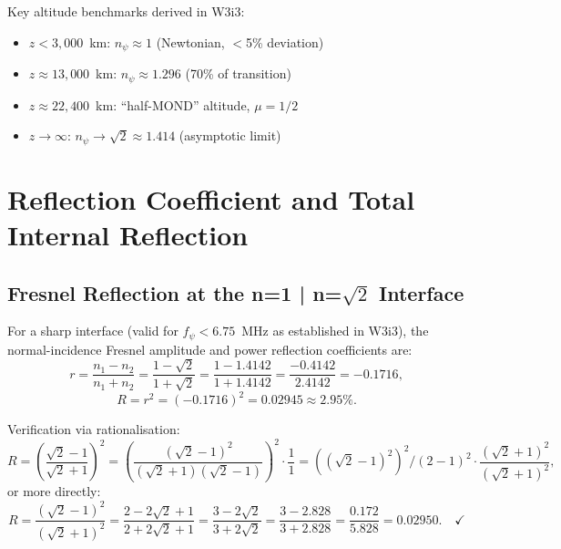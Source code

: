 \documentclass[aps,prd,twocolumn,superscriptaddress]{revtex4-2}
\newcommand{\npsi}{n_\psi}
\begin{document}
Key altitude benchmarks derived in W3i3:
\begin{itemize}
  \item $z < 3{,}000$~km: $\npsi \approx 1$ (Newtonian, $<$5\% deviation)
  \item $z \approx 13{,}000$~km: $\npsi \approx 1.296$ (70\% of transition)
  \item $z \approx 22{,}400$~km: ``half-MOND'' altitude, $\mu = 1/2$
  \item $z \to \infty$: $\npsi \to \sqrt{2} \approx 1.414$ (asymptotic limit)
\end{itemize}

\section{Reflection Coefficient and Total Internal Reflection}
\label{sec:reflection}

\subsection{Fresnel Reflection at the n=1 | n=\texorpdfstring{$\sqrt{2}$}{sqrt(2)} Interface}

For a sharp interface (valid for $f_\psi < 6.75$~MHz as established in
W3i3), the normal-incidence Fresnel amplitude and power reflection
coefficients are:
\begin{equation}
r = \frac{n_1 - n_2}{n_1 + n_2} = \frac{1 - \sqrt{2}}{1 + \sqrt{2}}
= \frac{1 - 1.4142}{1 + 1.4142} = \frac{-0.4142}{2.4142} = -0.1716,
\label{eq:r-fresnel}
\end{equation}
\begin{equation}
\boxed{R = r^2 = (-0.1716)^2 = 0.02945 \approx 2.95\%.}
\label{eq:R-result}
\end{equation}

Verification via rationalisation:
\begin{equation}
R = \left(\frac{\sqrt{2}-1}{\sqrt{2}+1}\right)^2
= \left(\frac{(\sqrt{2}-1)^2}{(\sqrt{2}+1)(\sqrt{2}-1)}\right)^2 \cdot \frac{1}{1}
= ((\sqrt{2}-1)^2)^2/(2-1)^2 \cdot \frac{(\sqrt{2}+1)^2}{(\sqrt{2}+1)^2},
\end{equation}
or more directly:
\begin{equation}
R = \frac{(\sqrt{2}-1)^2}{(\sqrt{2}+1)^2}
= \frac{2 - 2\sqrt{2} + 1}{2 + 2\sqrt{2} + 1}
= \frac{3 - 2\sqrt{2}}{3 + 2\sqrt{2}}
= \frac{3 - 2.828}{3 + 2.828}
= \frac{0.172}{5.828} = 0.02950. \quad \checkmark
\end{equation}
\end{document}
